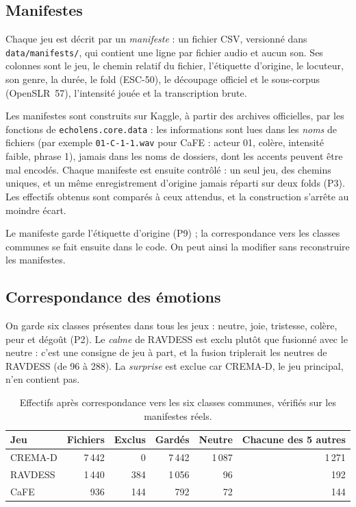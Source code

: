 
\subsection{Manifestes}
\label{sec:manifestes}

Chaque jeu est décrit par un \emph{manifeste} : un fichier CSV, versionné dans
\texttt{data/manifests/}, qui contient une ligne par fichier audio et aucun son. Ses colonnes
sont le jeu, le chemin relatif du fichier, l'étiquette d'origine, le locuteur, son genre, la
durée, le fold (ESC-50), le découpage officiel et le sous-corpus (OpenSLR~57), l'intensité
jouée et la transcription brute.

Les manifestes sont construits sur Kaggle, à partir des archives officielles, par les
fonctions de \texttt{echolens.core.data} : les informations sont lues dans les \emph{noms} de
fichiers (par exemple \texttt{01-C-1-1.wav} pour CaFE : acteur 01, colère, intensité faible,
phrase 1), jamais dans les noms de dossiers, dont les accents peuvent être mal encodés.
Chaque manifeste est ensuite contrôlé : un seul jeu, des chemins uniques, et un même
enregistrement d'origine jamais réparti sur deux folds (P3). Les effectifs obtenus sont comparés
à ceux attendus, et la construction s'arrête au moindre écart.

Le manifeste garde l'étiquette d'origine (P9) ; la correspondance vers les classes communes se
fait ensuite dans le code. On peut ainsi la modifier sans reconstruire les manifestes.

\subsection{Correspondance des émotions}
\label{sec:correspondance}

On garde six classes présentes dans tous les jeux : neutre, joie, tristesse, colère, peur et
dégoût (P2). Le \emph{calme} de RAVDESS est exclu plutôt que fusionné avec le neutre : c'est une
consigne de jeu à part, et la fusion triplerait les neutres de RAVDESS (de 96 à 288). La
\emph{surprise} est exclue car CREMA-D, le jeu principal, n'en contient pas.

\begin{table}[ht]
  \centering
  \small
  \begin{tabular}{@{}lrrrrr@{}}
    \toprule
    Jeu & Fichiers & Exclus & Gardés & Neutre & Chacune des 5 autres \\
    \midrule
    CREMA-D & 7\,442 & 0   & 7\,442 & 1\,087 & 1\,271 \\
    RAVDESS & 1\,440 & 384 & 1\,056 & 96     & 192 \\
    CaFE    & 936    & 144 & 792    & 72     & 144 \\
    \bottomrule
  \end{tabular}
  \caption{Effectifs après correspondance vers les six classes communes, vérifiés sur les
    manifestes réels.}
  \label{tab:emotions}
\end{table}

